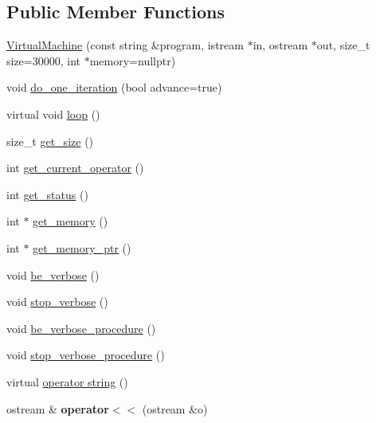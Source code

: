\subsection*{Public Member Functions}
\begin{DoxyCompactItemize}
\item 
\hyperlink{classVirtualMachine_a81dc06209be015ba53fd1ad93a3a5ef7}{Virtual\+Machine} (const string \&program, istream $\ast$in, ostream $\ast$out, size\+\_\+t size=30000, int $\ast$memory=nullptr)
\item 
void \hyperlink{classVirtualMachine_aa6de427678b13e4cb1900d33db279cbf}{do\+\_\+one\+\_\+iteration} (bool advance=true)
\item 
virtual void \hyperlink{classVirtualMachine_a85bd42167c75161f0dad72349214707c}{loop} ()
\item 
size\+\_\+t \hyperlink{classVirtualMachine_ace7438bc3a4fa6c0acedb8636a5354ab}{get\+\_\+size} ()
\item 
int \hyperlink{classVirtualMachine_a5d4cc0de286c14e8f02eb00d6cc8d3e4}{get\+\_\+current\+\_\+operator} ()
\item 
int \hyperlink{classVirtualMachine_ac93b4e3d667d479eab4193e38e59ec65}{get\+\_\+status} ()
\item 
int $\ast$ \hyperlink{classVirtualMachine_ab66b22be50763f52d2ff5666251df4d7}{get\+\_\+memory} ()
\item 
int $\ast$ \hyperlink{classVirtualMachine_a4a3c3c348eff0f3384ba96ad770886df}{get\+\_\+memory\+\_\+ptr} ()
\item 
void \hyperlink{classVirtualMachine_aca58b7d73d8594aa0c511459e997cdcc}{be\+\_\+verbose} ()
\item 
void \hyperlink{classVirtualMachine_af80080c053a7f4b6c9f53444a4ce2244}{stop\+\_\+verbose} ()
\item 
void \hyperlink{classVirtualMachine_a7461728411b1ef5889827be0fd3f47db}{be\+\_\+verbose\+\_\+procedure} ()
\item 
void \hyperlink{classVirtualMachine_a5eac3ead95ba1cb818c0634bd758cfc2}{stop\+\_\+verbose\+\_\+procedure} ()
\item 
virtual \hyperlink{classVirtualMachine_ab12bb31d1f511018a0a8e956efb72591}{operator string} ()
\item 
\mbox{\label{classVirtualMachine_a971c4f5c3c04096e25e727642f672344}} 
ostream \& {\bfseries operator$<$$<$} (ostream \&o)
\end{DoxyCompactItemize}
